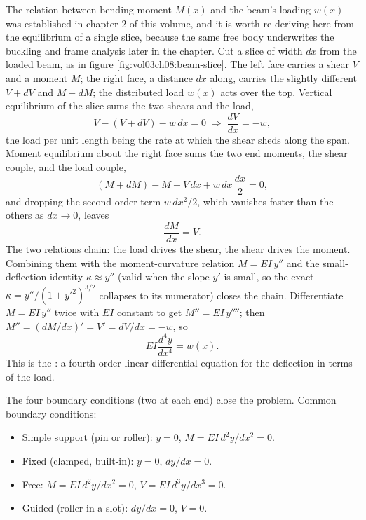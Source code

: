 

The relation between bending moment $M(x)$ and the beam's loading
$w(x)$ was established in chapter 2 of this volume, and it is worth
re-deriving here from the equilibrium of a single slice, because the same
free body underwrites the buckling and frame analysis later in the
chapter. Cut a slice of width $dx$ from the loaded beam, as in figure
\ref{fig:vol03ch08:beam-slice}. The left face carries a shear $V$ and a
moment $M$; the right face, a distance $dx$ along, carries the slightly
different $V+dV$ and $M+dM$; the distributed load $w(x)$ acts over the top.
Vertical equilibrium of the slice sums the two shears and the load,
\[
V - (V+dV) - w\,dx = 0 \;\Rightarrow\; \frac{dV}{dx} = -w,
\]
the load per unit length being the rate at which the shear sheds along
the span. Moment equilibrium about the right face sums the two end moments,
the shear couple, and the load couple,
\[
(M+dM) - M - V\,dx + w\,dx\,\frac{dx}{2} = 0,
\]
and dropping the second-order term $w\,dx^2/2$, which vanishes faster than
the others as $dx\to 0$, leaves
\[
\frac{dM}{dx} = V.
\]
The two relations chain: the load drives the shear, the shear drives the
moment. Combining them with the moment-curvature relation $M=EI\,y''$ and
the small-deflection identity $\kappa\approx y''$ (valid when the slope
$y'$ is small, so the exact $\kappa=y''/(1+y'^2)^{3/2}$ collapses to its
numerator) closes the chain. Differentiate $M=EI\,y''$ twice with $EI$
constant to get $M''=EI\,y''''$; then $M''=(dM/dx)'=V'=dV/dx=-w$, so
\[
EI \frac{d^4 y}{dx^4} = w(x).
\]
This is the : a fourth-order
linear differential equation for the deflection in terms of the load.


The four boundary conditions (two at each end) close the problem.
Common boundary conditions:

\begin{itemize}[leftmargin=*]
  \item Simple support (pin or roller): $y = 0$, $M = EI \,d^2 y/dx^2
    = 0$.
  \item Fixed (clamped, built-in): $y = 0$, $dy/dx = 0$.
  \item Free: $M = EI \,d^2 y/dx^2 = 0$, $V = EI \,d^3 y/dx^3 = 0$.
  \item Guided (roller in a slot): $dy/dx = 0$, $V = 0$.
\end{itemize}

